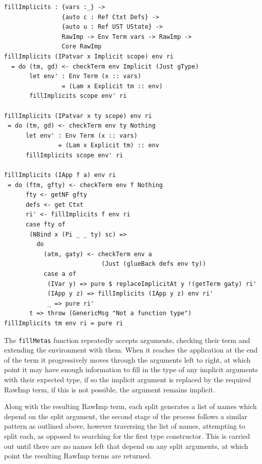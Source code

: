 \documentclass[a4paper]{article}
\begin{document}
\begin{center}
  \begin{verbatim}
fillImplicits : {vars :_} ->
                {auto c : Ref Ctxt Defs} -> 
                {auto u : Ref UST UState} ->
                RawImp -> Env Term vars -> RawImp -> 
                Core RawImp 
fillImplicits (IPatvar x Implicit scope) env ri
  = do (tm, gd) <- checkTerm env Implicit (Just gType)
       let env' : Env Term (x :: vars)
                = (Lam x Explicit tm :: env)
       fillImplicits scope env' ri
       
fillImplicits (IPatvar x ty scope) env ri
 = do (tm, gd) <- checkTerm env ty Nothing
      let env' : Env Term (x :: vars) 
               = (Lam x Explicit tm) :: env
      fillImplicits scope env' ri

fillImplicits (IApp f a) env ri
 = do (ftm, gfty) <- checkTerm env f Nothing
      fty <- getNF gfty
      defs <- get Ctxt
      ri' <- fillImplicits f env ri
      case fty of
       (NBind x (Pi _ _ ty) sc) => 
         do
           (atm, gaty) <- checkTerm env a
                           (Just (glueBack defs env ty))                    
           case a of 
            (IVar y) => pure $ replaceImplicitAt y !(getTerm gaty) ri'
            (IApp y z) => fillImplicits (IApp y z) env ri'
            _ => pure ri'
       t => throw (GenericMsg "Not a function type")
fillImplicits tm env ri = pure ri
  \end{verbatim}
\end{center}

The \texttt{fillMetas} function repeatedly accepts arguments,
checking their term and extending the environment with them.
When it reaches the application at the end of the term it progressively
moves through the arguments left to right, at which point it
may have enough information to fill in the type of any implicit
arguments with their expected type, if so the implicit argument is replaced by the
required RawImp term, if this is not possible, the argument remains implicit.

Along with the resulting RawImp term, each split generates a list of names which depend
on the split argument, the second stage of the process follows a similar pattern as outlined
above, however traversing the list of names, attempting to split each, as opposed to searching
for the first type constructor. This is carried out until there are no names left that depend on
any split arguments, at which point the resulting RawImp terms are returned.
\end{document}
